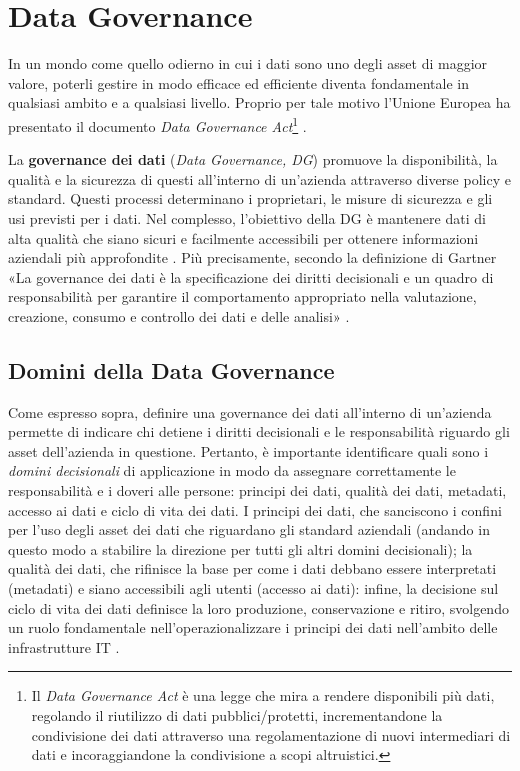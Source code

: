\section{Data Governance}
In un mondo come quello odierno in cui i dati sono uno degli asset di maggior valore, poterli gestire in modo efficace ed efficiente diventa fondamentale in qualsiasi ambito e a qualsiasi livello. Proprio per tale motivo l'Unione Europea ha presentato il documento \textit{Data Governance Act}\footnote{Il \textit{Data Governance Act} è una legge che mira a rendere disponibili più dati, regolando il riutilizzo di dati pubblici/protetti, incrementandone la condivisione dei dati attraverso una regolamentazione di nuovi intermediari di dati e incoraggiandone la condivisione a scopi altruistici.} \cite{europe_data_governance_act}.

La \textbf{governance dei dati} (\textit{Data Governance, DG}) promuove la disponibilità, la qualità e la sicurezza di questi all'interno di un'azienda attraverso diverse policy e standard. Questi processi determinano i proprietari, le misure di sicurezza e gli usi previsti per i dati. Nel complesso, l'obiettivo della DG è mantenere dati di alta qualità che siano sicuri e facilmente accessibili per ottenere informazioni aziendali più approfondite \cite{ibm_data_governance}.
Più precisamente, secondo la definizione di Gartner «La governance dei dati è la specificazione dei diritti decisionali e un quadro di responsabilità per garantire il comportamento appropriato nella valutazione, creazione, consumo e controllo dei dati e delle analisi» \cite{gartner_data_governance_definition}.

\subsection{Domini della Data Governance}
Come espresso sopra, definire una governance dei dati all'interno di un'azienda permette di indicare chi detiene i diritti decisionali e le responsabilità riguardo gli asset dell'azienda in questione. Pertanto, è importante identificare quali sono i \textit{domini decisionali} di applicazione in modo da assegnare correttamente le responsabilità e i doveri alle persone: principi dei dati, qualità dei dati, metadati, accesso ai dati e ciclo di vita dei dati. I principi dei dati, che sanciscono i confini per l'uso degli asset dei dati che riguardano gli standard aziendali (andando in questo modo a stabilire la direzione per tutti gli altri domini decisionali); la qualità dei dati, che rifinisce la base per come i dati debbano essere interpretati (metadati) e siano accessibili agli utenti (accesso ai dati): infine, la decisione sul ciclo di vita dei dati definisce la loro produzione, conservazione e ritiro, svolgendo un ruolo fondamentale nell'operazionalizzare i principi dei dati nell'ambito delle infrastrutture IT \cite{data_governance_activities}.

